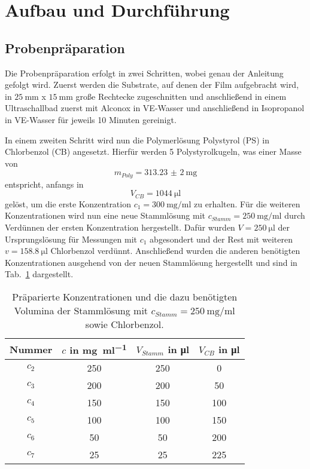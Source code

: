 \section{\label{sec:aufbau}Aufbau und Durchführung} %
\subsection{Probenpräparation}
Die Probenpräparation erfolgt in zwei Schritten, wobei genau der Anleitung~\cite[]{Anleitung} gefolgt wird. Zuerst werden die Substrate, auf denen der Film aufgebracht wird, in $\SI{25}{\milli\metre}$ x $\SI{15}{\milli\metre}$ große Rechtecke zugeschnitten und anschließend in einem Ultraschallbad zuerst mit Alconox in VE-Wasser und anschließend in Isopropanol in VE-Wasser für jeweils 10 Minuten gereinigt.

In einem zweiten Schritt wird nun die Polymerlösung Polystyrol (PS) in Chlorbenzol (CB) angesetzt. Hierfür werden 5 Polystyrolkugeln, was einer Masse von 
\begin{equation*}
    m_{Poly} = \SI{313,23(2)}{\milli\gram}
\end{equation*}
entspricht, anfangs in
\begin{equation*}
    V_{CB} = \SI{1044}{\micro\litre}
\end{equation*}
gelöst, um die erste Konzentration $c_1 = \SI{300}{\milli\gram\per\milli\litre}$ zu erhalten. Für die weiteren Konzentrationen wird nun eine neue Stammlösung mit $c_{Stamm} = \SI{250}{\milli\gram\per\milli\litre}$ durch Verdünnen der ersten Konzentration hergestellt. Dafür wurden $V = \SI{250}{\micro\litre}$ der Ursprungslösung für Messungen mit $c_1$ abgesondert und der Rest mit weiteren $v = \SI{158,8}{\micro\litre}$ Chlorbenzol verdünnt. Anschließend wurden die anderen benötigten Konzentrationen ausgehend von der neuen Stammlösung hergestellt und sind in Tab.~\ref{tab:verduennen} dargestellt.

\begin{table}[h!]
    \centering
    \begin{tabular}{|c|c|c|c|}
        \hline
        Nummer & $c$ in \si{\milli\gram\per\milli\litre} & $V_{Stamm}$ in \si{\micro\litre} & $V_{CB}$ in \si{\micro\litre} \\ [0.5ex]
        \hline \hline
        $c_2$ & 250 & 250 & 0\\
        $c_3$ & 200 & 200 & 50\\
        $c_4$ & 150 & 150 & 100\\
        $c_5$ & 100 & 100 & 150\\
        $c_6$ & 50 & 50 & 200\\
        $c_7$ & 25 & 25 & 225\\ [1ex]
        \hline
    \end{tabular}
    \caption{Präparierte Konzentrationen und die dazu benötigten Volumina der Stammlösung mit $c_{Stamm} = \SI{250}{\milli\gram\per\milli\litre}$ sowie Chlorbenzol.}
    \label{tab:verduennen}
\end{table}

